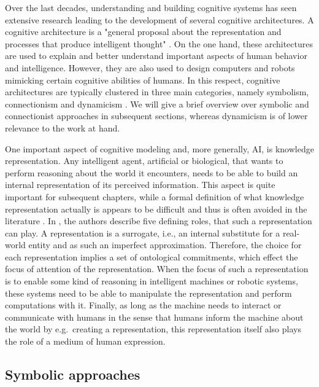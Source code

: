 Over the last decades, understanding and building cognitive systems has seen extensive research leading to the development of several cognitive architectures.
A cognitive architecture is a "general proposal about the representation and processes that produce intelligent thought" \cite{Thagard2012}.
On the one hand, these architectures are used to explain and better understand important aspects of human behavior and intelligence.
However, they are also used to design computers and robots mimicking certain cognitive abilities of humans.
In this respect, cognitive architectures are typically clustered in three main categories, namely symbolism, connectionism and dynamicism \cite{Eliasmith2013}.
We will give a brief overview over symbolic and connectionist approaches in subsequent sections, whereas dynamicism \cite{Schoener2008} is of lower relevance to the work at hand.

One important aspect of cognitive modeling and, more generally, \ac{AI}, is knowledge representation.
Any intelligent agent, artificial or biological, that wants to perform reasoning about the world it encounters, needs to be able to build an internal representation of its perceived information.
This aspect is quite important for subsequent chapters, while a formal definition of what knowledge representation actually is appears to be difficult and thus is often avoided in the literature \cite{Davis1993}.
In \cite{Davis1993}, the authors describe five defining roles, that such a representation can play.
A representation is a surrogate, i.e., an internal substitute for a real-world entity and as such an imperfect approximation.
Therefore, the choice for each representation implies a set of ontological commitments, which effect the focus of attention of the representation.  
When the focus of such a representation is to enable some kind of reasoning in intelligent machines or robotic systems, these systems need to be able to manipulate the representation and perform computations with it.
Finally, as long as the machine needs to interact or communicate with humans in the sense that humans inform the machine about the world by e.g.\ creating a representation, this representation itself also plays the role of a medium of human expression.

\subsection{Symbolic approaches}%
\label{subsec:symbolic_approaches}


